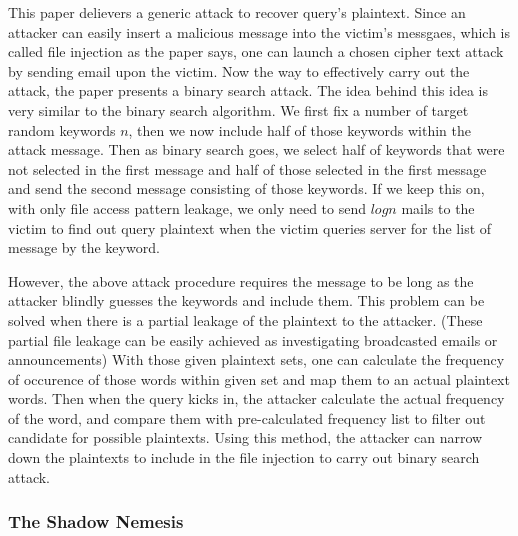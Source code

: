 \documentclass[a4paper]{article}
\begin{document}
This paper \cite{197239} delievers a generic attack to recover query's plaintext. Since an attacker can easily insert a malicious message into the victim's messgaes, which is called file injection as the paper says, one can launch a chosen cipher text attack by sending email upon the victim. Now the way to effectively carry out the attack, the paper presents a binary search attack. The idea behind this idea is very similar to the binary search algorithm. We first fix a number of target random keywords $n$, then we now include half of those keywords within the attack message. Then as binary search goes, we select half of keywords that were not selected in the first message and half of those selected in the first message and send the second message consisting of those keywords. If we keep this on, with only file access pattern leakage, we only need to send $log n$ mails to the victim to find out query plaintext when the victim queries server for the list of message by the keyword.
\par However, the above attack procedure requires the message to be long as the attacker blindly guesses the keywords and include them. This problem can be solved when there is a partial leakage of the plaintext to the attacker. (These partial file leakage can be easily achieved as investigating broadcasted emails or announcements) With those given plaintext sets, one can calculate the frequency of occurence of those words within given set and map them to an actual plaintext words. Then when the query kicks in, the attacker calculate the actual frequency of the word, and compare them with pre-calculated frequency list to filter out candidate for possible plaintexts. Using this method, the attacker can narrow down the plaintexts to include in the file injection to carry out binary search attack.

\subsubsection*{The Shadow Nemesis}
\end{document}
